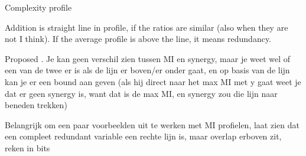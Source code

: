\documentclass[../main.tex]{subfiles}
\begin{document}
Complexity profile \cite{bar2013computationally}

Addition is straight line in profile, if the ratios are similar (also when they are not I think).
If the average profile is above the line, it means redundancy.

Proposed \cite{quax2017quantifying}.
Je kan geen verschil zien tussen MI en synergy, maar je weet wel of een van de twee er is als de lijn er boven/er onder gaat, en op basis van de lijn kan je er een bound aan geven (als hij direct naar het max MI met y gaat weet je dat er geen synergy is, want dat is de max MI, en synergy zou die lijn naar beneden trekken)

Belangrijk om een paar voorbeelden uit te werken met MI profielen, laat zien dat een compleet redundant variable een rechte lijn is, maar overlap erboven zit, reken in bits
\end{document}
